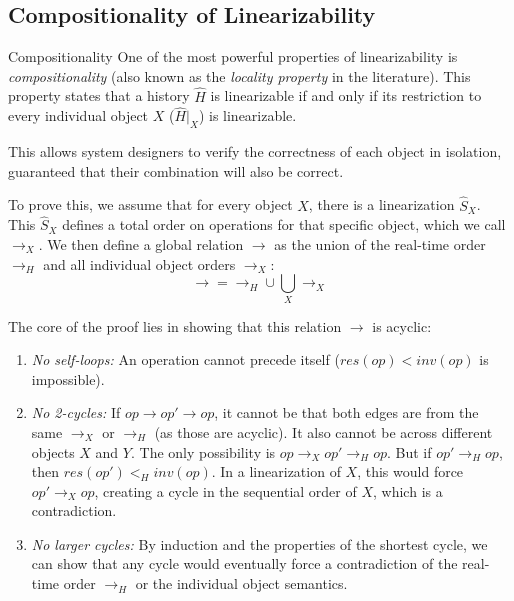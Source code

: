\subsection{Compositionality of Linearizability}
\begin{Thm}{Compositionality}{}
    One of the most powerful properties of linearizability is \textit{compositionality} (also known as the \textit{locality property} in the literature). This property states that a history $\widehat{H}$ is linearizable if and only if its restriction to every individual object $X$ ($\widehat{H}|_X$) is linearizable. 

    This allows system designers to verify the correctness of each object in isolation, guaranteed that their combination will also be correct.

    \begin{demonstration}
    To prove this, we assume that for every object $X$, there is a linearization $\widehat{S}_X$. This $\widehat{S}_X$ defines a total order on operations for that specific object, which we call $\longrightarrow_X$. We then define a global relation $\longrightarrow$ as the union of the real-time order $\longrightarrow_H$ and all individual object orders $\longrightarrow_X$:
    \begin{equation*}
        \longrightarrow =\longrightarrow_H \cup \bigcup_X \longrightarrow_X
    \end{equation*}

    The core of the proof lies in showing that this relation $\longrightarrow$ is acyclic:
    \begin{enumerate}
        \item \textit{No self-loops:} An operation cannot precede itself ($res(op)<inv(op)$ is impossible).
        \item \textit{No 2-cycles:} If $op\longrightarrow op'\longrightarrow op$, it cannot be that both edges are from the same $\longrightarrow_X$ or $\longrightarrow_H$ (as those are acyclic). It also cannot be across different objects $X$ and $Y$. The only possibility is $op\longrightarrow_X op'\longrightarrow_H op$. But if $op'\longrightarrow_H op$, then $res(op')<_H inv(op)$. In a linearization of $X$, this would force $op'\longrightarrow_X op$, creating a cycle in the sequential order of $X$, which is a contradiction.
        \item \textit{No larger cycles:} By induction and the properties of the shortest cycle, we can show that any cycle would eventually force a contradiction of the real-time order $\longrightarrow_H$ or the individual object semantics.
    \end{enumerate}


\end{demonstration}
\end{Thm}
